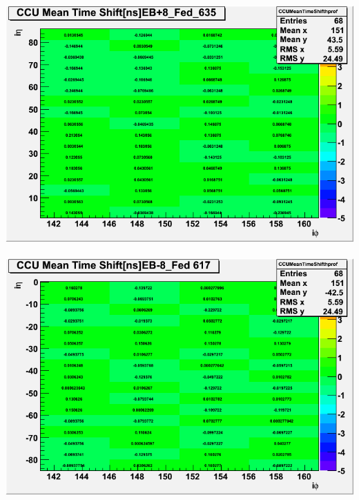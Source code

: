 \begin{center}
\centering
\mbox{\includegraphics[scale=0.2]{THESISPLOTS/CCU_Mean_Time_ShiftEB_Plus8_Fed_635.png} \quad
\includegraphics[scale=0.2]{THESISPLOTS/CCU-Mean-Time-Shift-EBMinus8-Fed617.png}}


\end{center}
